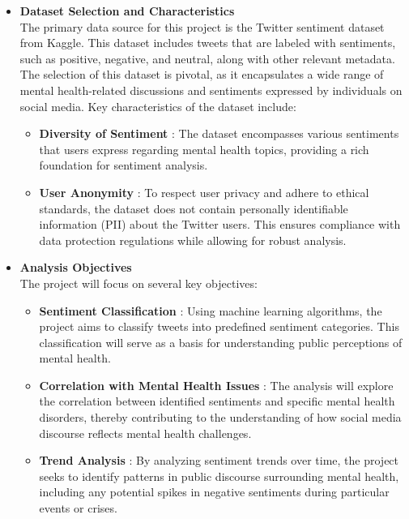 \begin{itemize}
    \item \textbf{Dataset Selection and Characteristics} \\
    \noindent
    The primary data source for this project is the Twitter sentiment dataset from Kaggle. This dataset includes tweets that are labeled with sentiments, such as positive, negative, and neutral, along with other relevant metadata. The selection of this dataset is pivotal, as it encapsulates a wide range of mental health-related discussions and sentiments expressed by individuals on social media. Key characteristics of the dataset include:
    \begin{itemize}
        \item \textbf{Diversity of Sentiment} :
        \noindent
        The dataset encompasses various sentiments that users express regarding mental health topics, providing a rich foundation for sentiment analysis.
        \item \textbf{User Anonymity} :
        \noindent
        To respect user privacy and adhere to ethical standards, the dataset does not contain personally identifiable information (PII) about the Twitter users. This ensures compliance with data protection regulations while allowing for robust analysis.
    \end{itemize}

    \item \textbf{Analysis Objectives} \\
    \noindent
    The project will focus on several key objectives:
    \begin{itemize}
        \item \textbf{Sentiment Classification} :
        \noindent 
        Using machine learning algorithms, the project aims to classify tweets into predefined sentiment categories. This classification will serve as a basis for understanding public perceptions of mental health.
        \item \textbf{Correlation with Mental Health Issues} :
        \noindent
        The analysis will explore the correlation between identified sentiments and specific mental health disorders, thereby contributing to the understanding of how social media discourse reflects mental health challenges.
        \item \textbf{Trend Analysis} :
        \noindent
        By analyzing sentiment trends over time, the project seeks to identify patterns in public discourse surrounding mental health, including any potential spikes in negative sentiments during particular events or crises.
    \end{itemize}


\end{itemize}
